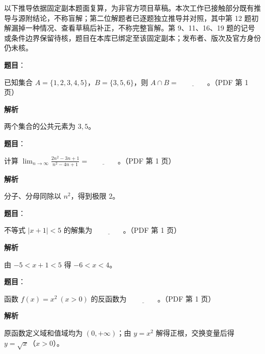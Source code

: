 

\begin{gktip}
以下推导依据固定副本题面复算，为非官方项目草稿。本次工作已接触部分既有推导与源附结论，不称盲解；第二位解题者已逐题独立推导并对照，其中第 12 题初解漏掉一种情况、查看草稿后补正，不称完整盲解。第 9、11、16、19 题的记号或条件边界保留待核，题目在本库已绑定至该固定副本；发布者、版次及官方身份仍未核。
\end{gktip}

\begin{answer}

\textbf{题目}：

已知集合 $A=\{1,2,3,4,5\}$，$B=\{3,5,6\}$，则 $A\cap B=\underline{\qquad\qquad}$。（PDF 第 1 页）

\textbf{解析}

两个集合的公共元素为 $3,5$。


\end{answer}
\begin{answer}

\textbf{题目}：

计算 $\displaystyle\lim_{n\to\infty}\frac{2n^2-3n+1}{n^2-4n+1}=\underline{\qquad\qquad}$。（PDF 第 1 页）

\textbf{解析}

分子、分母同除以 $n^2$，得到极限 $2$。


\end{answer}
\begin{answer}

\textbf{题目}：

不等式 $|x+1|<5$ 的解集为 $\underline{\qquad\qquad}$。（PDF 第 1 页）

\textbf{解析}

由 $-5<x+1<5$ 得 $-6<x<4$。


\end{answer}
\begin{answer}

\textbf{题目}：

函数 $f(x)=x^2\ (x>0)$ 的反函数为 $\underline{\qquad\qquad}$。（PDF 第 1 页）

\textbf{解析}

原函数定义域和值域均为 $(0,+\infty)$；由 $y=x^2$ 解得正根，交换变量后得 $y=\sqrt{x}$（$x>0$）。


\end{answer}
